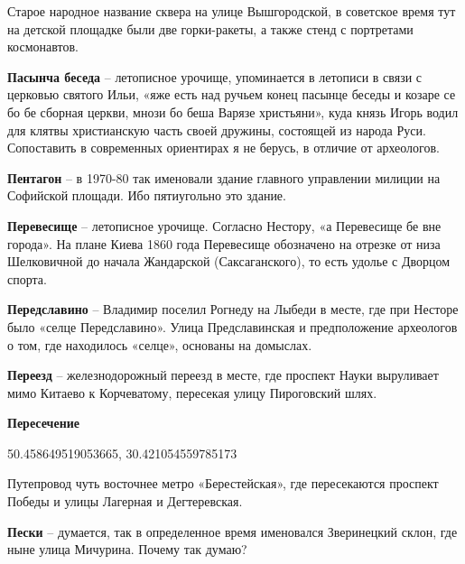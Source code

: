 Старое народное название сквера на улице Вышгородской, в советское время тут на детской площадке были две горки-ракеты, а также стенд с портретами космонавтов.\\

\medskip

\textbf{Пасынча беседа} – летописное урочище, уп\-оминается в летописи в связи с церковью святого Ильи, «яже есть над ручьем конец пасынце беседы и козаре се бо бе сборная церкви, мнози бо беша Варязе христьяни», куда князь Игорь водил для клятвы христианскую часть своей дружины, состоящей из народа Руси. Сопоставить в современных ориентирах я не берусь, в отличие от археологов.\\

\medskip

\textbf{Пентагон} – в 1970-80 так именовали здание главного управлении милиции на Софийской площади. Ибо пятиугольно это здание.\\

\medskip

\textbf{Перевесище} – летописное урочище. Согласно Нестору, «а Перевесище бе вне города». На плане Киева 1860 года Перевесище обозначено на отрезке от низа Шелковичной до начала Жандарской (Саксаганского), то есть удолье с Дворцом спорта.\\

\medskip

\textbf{Передславино} – Владимир поселил Рогнеду на Лыбеди в месте, где при Несторе было «селце Передславино». Улица Предславинская и предположение археологов о том, где находилось «селце», основаны на домыслах.\\

\medskip

\textbf{Переезд} – железнодорожный переезд в месте, где проспект Науки выруливает мимо Китаево к Корчеватому, пересекая улицу Пироговский шлях.\\

\medskip

\textbf{Пересечение}

50.458649519053665, 30.421054559785173

Путепровод  чуть восточнее метро «Берестейская», где пересекаются проспект Победы и улицы Лагерная и Дегтеревская.\\

\medskip

\textbf{Пески}  – думается, так в определенное время именовался Зверинецкий склон, где ныне улица Мичурина. Почему так думаю?

